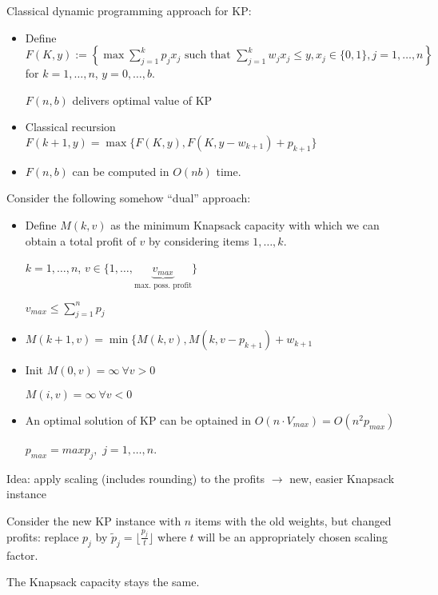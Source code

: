 \documentclass[11pt]{article}
\theoremstyle{definition}
\theoremstyle{definition}
\begin{document}
Classical dynamic programming approach for KP:
\begin{itemize}
\item Define $ F(K, y) := \left\{ \max \sum_{j = 1}^k p_j x_j \text{ such that } \sum \limits_{j=1}^k w_j x_j \leq y, x_j \in \{0, 1\}, j = 1, \dots, n \right\} $ for $ k = 1, \dots, n $, $ y = 0, \dots, b $.

$ F(n, b) $ delivers optimal value of KP
\item Classical recursion $ F(k + 1, y) = \max \{F( K, y), F(K, y - w_{k + 1} ) + p_{k + 1} \} $
\item $ F(n, b) $ can be computed in $ O(n b) $ time.
\end{itemize}

Consider the following somehow ``dual'' approach:
\begin{itemize}
\item Define $ M(k, v) $ as the minimum Knapsack capacity with which we can obtain a total profit of $ v $ by considering items $ 1, \dots, k $.

$ k = 1, \dots, n $, $ v \in \{1, \dots, \underbrace{v_{max}}_{\text{max. poss. profit}} \} $ %

$ v_{max} \leq \sum \limits_{j = 1}^n p_j $

\item $ M(k + 1, v) = \min \{ M(k, v), M(k, v - p_{k + 1}) + w_{ k + 1} $

\item Init $ M(0, v) = \infty ~ \forall v > 0 $

$ M(i, v) = \infty ~ \forall v < 0 $


\item An optimal solution of KP can be optained in $ O(n \cdot V_{max} ) = O(n ^2 p_{max}) $

$ p_{max} = max p_j,$ $ j = 1, \dots, n $.
\end{itemize}

Idea: apply scaling (includes rounding) to the profits $ \rightarrow $ new, easier Knapsack instance

Consider the new KP instance with $ n $ items with the old weights, but changed profits: replace $ p_ j $ by $ \tilde p_j = \lfloor \frac{p_j}{t} \rfloor $ where $ t $ will be an appropriately chosen scaling factor.

The Knapsack capacity stays the same. %
\end{document}
